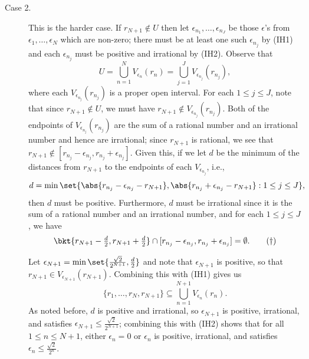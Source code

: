 \documentclass{lew98_solutions}
\begin{document}
\begin{solution}
\begin{enumerate}
\begin{description}
            \item[Case 2.] This is the harder case. If \( r_{N+1} \not\in U \) then let \( \epsilon_{n_1}, \ldots, \epsilon_{n_J} \) be those \( \epsilon \)'s from \( \epsilon_1, \ldots, \epsilon_N \) which are non-zero; there must be at least one such \( \epsilon_{n_j} \) by (IH1) and each \( \epsilon_{n_j} \) must be positive and irrational by (IH2). Observe that
            \[
                U = \bigcup_{n=1}^N V_{\epsilon_n}(r_n) = \bigcup_{j=1}^J V_{\epsilon_{n_j}}(r_{n_j}),
            \]
            where each \( V_{\epsilon_{n_j}}(r_{n_j}) \) is a proper open interval. For each \( 1 \leq j \leq J \), note that since \( r_{N+1} \not\in U \), we must have \( r_{N+1} \not\in V_{\epsilon_{n_j}}(r_{n_j}) \). Both of the endpoints of \( V_{\epsilon_{n_j}}(r_{n_j}) \) are the sum of a rational number and an irrational number and hence are irrational; since \( r_{N+1} \) is rational, we see that \( r_{N+1} \not\in [r_{n_j} - \epsilon_{n_j}, r_{n_j} + \epsilon_{n_j}] \). Given this, if we let \( d \) be the minimum of the distances from \( r_{N+1} \) to the endpoints of each \( V_{\epsilon_{n_j}} \), i.e.,
            \[
                d = \min \set{ \abs{r_{n_j} - \epsilon_{n_j} - r_{N+1}}, \abs{r_{n_j} + \epsilon_{n_j} - r_{N+1}} : 1 \leq j \leq J },
            \]
            then \( d \) must be positive. Furthermore, \( d \) must be irrational since it is the sum of a rational number and an irrational number, and for each \( 1 \leq j \leq J \), we have
            \[
                \bkt{ r_{N+1} - \tfrac{d}{2}, r_{N+1} + \tfrac{d}{2} } \cap [r_{n_j} - \epsilon_{n_j}, r_{n_j} + \epsilon_{n_j}] = \emptyset. \tag{\dag}
            \]

            Let \( \epsilon_{N+1} = \min \set{ \tfrac{\sqrt{2}}{2^{N+1}}, \tfrac{d}{2} } \) and note that \( \epsilon_{N+1} \) is positive, so that \( r_{N+1} \in V_{\epsilon_{N+1}}(r_{N+1}) \). Combining this with (IH1) gives us
            \[
                \{ r_1, \ldots, r_N, r_{N+1} \} \subseteq \bigcup_{n=1}^{N+1} V_{\epsilon_n}(r_n).
            \]
            As noted before, \( d \) is positive and irrational, so \( \epsilon_{N+1} \) is positive, irrational, and satisfies \( \epsilon_{N+1} \leq \tfrac{\sqrt{2}}{2^{N+1}} \); combining this with (IH2) shows that for all \( 1 \leq n \leq N + 1 \), either \( \epsilon_n = 0 \) or \( \epsilon_n \) is positive, irrational, and satisfies \( \epsilon_n \leq \tfrac{\sqrt{2}}{2^n} \).


\end{description}
\end{enumerate}
\end{solution}
\end{document}

